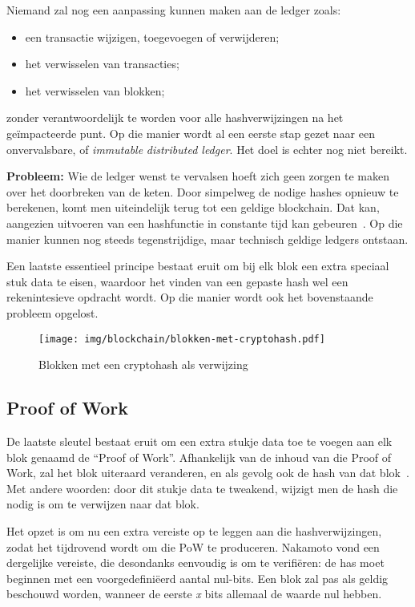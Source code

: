 Niemand zal nog een aanpassing kunnen maken aan de ledger zoals:
\begin{itemize}
	\item een transactie wijzigen, toegevoegen of verwijderen;
	\item het verwisselen van transacties;
	\item het verwisselen van blokken;
\end{itemize}

zonder verantwoordelijk te worden voor alle hashverwijzingen na het geïmpacteerde punt. Op die manier wordt al een eerste stap gezet naar een onvervalsbare, of \textit{immutable} \textit{distributed ledger}. Het doel is echter nog niet bereikt.

\textbf{Probleem:} 
Wie de ledger wenst te vervalsen hoeft zich geen zorgen te maken over het doorbreken van de keten. 
Door simpelweg de nodige hashes opnieuw te berekenen, komt men uiteindelijk terug tot een geldige blockchain. Dat kan, aangezien uitvoeren van een hashfunctie in constante tijd kan gebeuren~\autocite{Slaats2019}. Op die manier kunnen nog steeds tegenstrijdige, maar technisch geldige ledgers ontstaan.

Een laatste essentieel principe bestaat eruit om bij elk blok een extra speciaal stuk data te eisen, waardoor het vinden van een gepaste hash wel een rekenintesieve opdracht wordt. Op die manier wordt ook het bovenstaande probleem opgelost.

\begin{figure}[H]
	\centering
	\texttt{[image: img/blockchain/blokken-met-cryptohash.pdf]}
	\caption{\label{fig:blokken-met-cryptohash}Blokken met een cryptohash als verwijzing}
\end{figure}

\subsection{Proof of Work}
\label{sub:proof-of-work}

De laatste sleutel bestaat eruit om een extra stukje data toe te voegen aan elk blok genaamd de ``Proof of Work''.
Afhankelijk van de inhoud van die Proof of Work, zal het blok uiteraard veranderen, en als gevolg ook de hash van dat blok~\autocite{Nakamoto2008}. Met andere woorden: door dit stukje data te tweakend, wijzigt men de hash die nodig is om te verwijzen naar dat blok.

Het opzet is om nu een extra vereiste op te leggen aan die hashverwijzingen, zodat het tijdrovend wordt om die PoW te produceren. Nakamoto vond een dergelijke vereiste, die desondanks eenvoudig is om te verifiëren: de has moet beginnen met een voorgedefiniëerd aantal nul-bits. Een blok zal pas als geldig beschouwd worden, wanneer de eerste \textit{x} bits allemaal de waarde nul hebben. 

